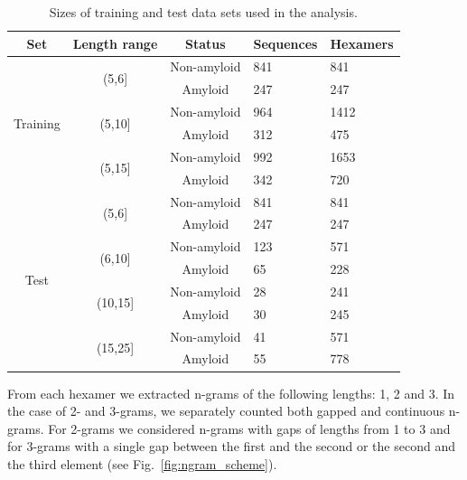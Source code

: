 \documentclass[a4,center,fleqn]{NAR}
\begin{document}
\begin{table}[]
\centering
\small
\caption{Sizes of training and test data sets used in the analysis.}
\label{tab:data_sets}
\begin{tabular}{cccll}
\hline
Set & Length range & Status & Sequences & Hexamers \\ 
\toprule
\multirow{6}{*}{Training} & \multirow{2}{*}{(5,6{]}} & Non-amyloid & 841 & 841 
\\
 &  & \cellcolor[gray]{0.85}Amyloid & \cellcolor[gray]{0.85}247 & 
\cellcolor[gray]{0.85}247 \\
 \cline{2-5}
 & \multirow{2}{*}{(5,10{]}} & Non-amyloid & 964 & 1412 \\
 &  & \cellcolor[gray]{0.85}Amyloid & \cellcolor[gray]{0.85}312 & 
\cellcolor[gray]{0.85}475 \\
 \cline{2-5}
 & \multirow{2}{*}{(5,15{]}} & Non-amyloid & 992 & 1653 \\
 &  & \cellcolor[gray]{0.85}Amyloid & \cellcolor[gray]{0.85}342 & 
\cellcolor[gray]{0.85}720 \\
 \hline
 \hline
\multirow{8}{*}{Test} & \multirow{2}{*}{(5,6{]}} & Non-amyloid & 841 & 841 \\
 &  & \cellcolor[gray]{0.85}Amyloid & \cellcolor[gray]{0.85}247 & 
\cellcolor[gray]{0.85}247 \\
 \cline{2-5}
 & \multirow{2}{*}{(6,10{]}} & Non-amyloid & 123 & 571 \\
 &  & \cellcolor[gray]{0.85}Amyloid & \cellcolor[gray]{0.85}65 & 
\cellcolor[gray]{0.85}228 \\
 \cline{2-5}
 & \multirow{2}{*}{(10,15{]}} & Non-amyloid & 28 & 241 \\
 &  & \cellcolor[gray]{0.85}Amyloid & \cellcolor[gray]{0.85}30 & 
\cellcolor[gray]{0.85}245 \\
 \cline{2-5}
 & \multirow{2}{*}{(15,25{]}} & Non-amyloid & 41 & 571 \\
 &  & \cellcolor[gray]{0.85}Amyloid & \cellcolor[gray]{0.85}55 & 
\cellcolor[gray]{0.85}778 \\
 \bottomrule
\end{tabular}
\end{table}

  From each hexamer we extracted n-grams of the following lengths: 1, 2 and 3. 
In the case of 2- and 3-grams, we separately counted both gapped and continuous 
n-grams. For 2-grams we considered n-grams with gaps of lengths from 1 to 3 and 
for 3-grams with a single gap between the first and the second or the second and 
the third element (see Fig.~\ref{fig:ngram_scheme}).
\end{document}
